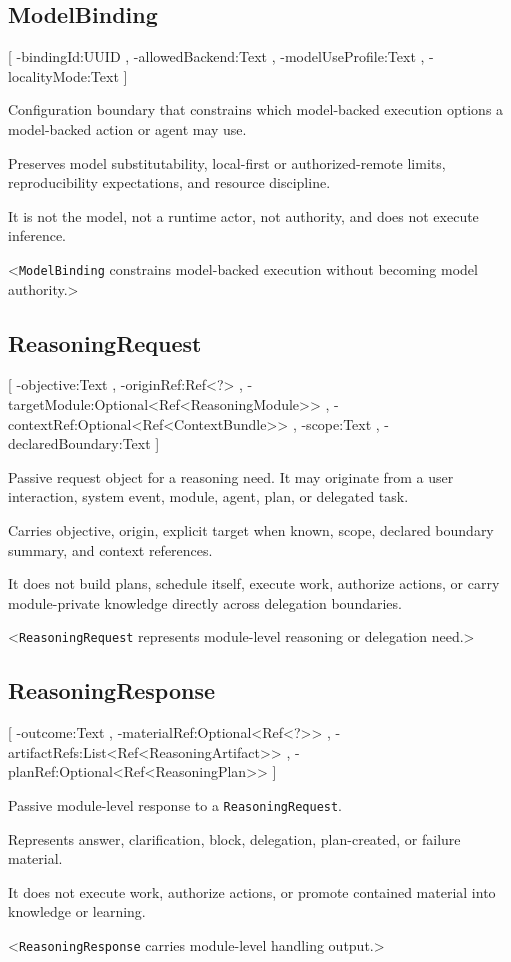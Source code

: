 \documentclass[11pt]{report}
\begin{document}
\subsection{ModelBinding}
[
	\UMLAt-bindingId:UUID ,
	\UMLAt-allowedBackend:Text ,
	\UMLAt-modelUseProfile:Text ,
	\UMLAt-localityMode:Text
]{%
	\item[] Configuration boundary that constrains which model-backed execution options a model-backed action or agent may use.
	\item[] Preserves model substitutability, local-first or authorized-remote limits, reproducibility expectations, and resource discipline.
	\item[] It is not the model, not a runtime actor, not authority, and does not execute inference.
}<\texttt{ModelBinding} constrains model-backed execution without becoming model authority.>

\subsection{ReasoningRequest}
[
	\UMLAt-objective:Text ,
	\UMLAt-originRef:Ref<?> ,
	\UMLAt-targetModule:Optional<Ref<ReasoningModule>> ,
	\UMLAt-contextRef:Optional<Ref<ContextBundle>> ,
	\UMLAt-scope:Text ,
	\UMLAt-declaredBoundary:Text
]{%
	\item[] Passive request object for a reasoning need. It may originate from a user interaction, system event, module, agent, plan, or delegated task.
	\item[] Carries objective, origin, explicit target when known, scope, declared boundary summary, and context references.
	\item[] It does not build plans, schedule itself, execute work, authorize actions, or carry module-private knowledge directly across delegation boundaries.
}<\texttt{ReasoningRequest} represents module-level reasoning or delegation need.>

\subsection{ReasoningResponse}
[
	\UMLAt-outcome:Text ,
	\UMLAt-materialRef:Optional<Ref<?>> ,
	\UMLAt-artifactRefs:List<Ref<ReasoningArtifact>> ,
	\UMLAt-planRef:Optional<Ref<ReasoningPlan>>
]{%
	\item[] Passive module-level response to a \texttt{ReasoningRequest}.
	\item[] Represents answer, clarification, block, delegation, plan-created, or failure material.
	\item[] It does not execute work, authorize actions, or promote contained material into knowledge or learning.
}<\texttt{ReasoningResponse} carries module-level handling output.>
\end{document}
